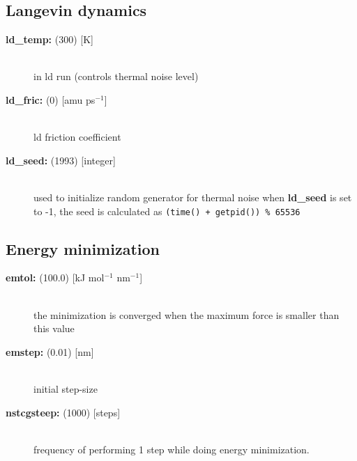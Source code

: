 \subsection{Langevin dynamics}
\begin{description}
\item[{\bf ld\_temp: }(300) {[K]}]\mbox{}\\
 in ld run (controls thermal noise level)
\item[{\bf ld\_fric: }(0) {[amu ps$^{-1}$]}]\mbox{}\\
ld friction coefficient
\item[{\bf ld\_seed: }(1993) {[integer]}]\mbox{}\\
used to initialize random generator for thermal noise
when {\bf ld\_seed} is set to -1, the seed is calculated as
{\tt (time() + getpid()) \% 65536}
\end{description}

\subsection{Energy minimization}
\begin{description}
\item[{\bf emtol: }(100.0) {[kJ mol$^{-1}$ nm$^{-1}$]}]\mbox{}\\
the minimization is converged when the maximum force is smaller than 
this value
\item[{\bf emstep: }(0.01) {[nm]}]\mbox{}\\
initial step-size
\item[{\bf nstcgsteep: }(1000) {[steps]}]\mbox{}\\
frequency of performing 1  step while doing
 energy minimization.
\end{description}

